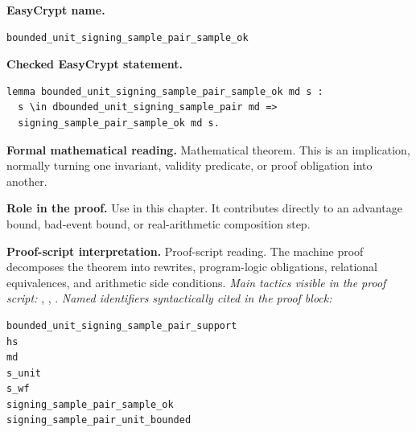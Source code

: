 \begin{formaltheorem}
\noindent\textbf{EasyCrypt name.}
\begin{lstlisting}[language=EasyCrypt,basicstyle=\ttfamily\scriptsize]
bounded_unit_signing_sample_pair_sample_ok
\end{lstlisting}
\noindent\textbf{Checked EasyCrypt statement.}
\begin{lstlisting}[language=EasyCrypt,basicstyle=\ttfamily\scriptsize]
lemma bounded_unit_signing_sample_pair_sample_ok md s :
  s \in dbounded_unit_signing_sample_pair md =>
  signing_sample_pair_sample_ok md s.
\end{lstlisting}
\noindent\textbf{Formal mathematical reading.}
Mathematical theorem. This is an implication, normally turning one invariant, validity predicate, or proof obligation into another.

\noindent\textbf{Role in the proof.}
Use in this chapter. It contributes directly to an advantage bound, bad-event bound, or real-arithmetic composition step.

\noindent\textbf{Proof-script interpretation.}
Proof-script reading. The machine proof decomposes the theorem into rewrites, program-logic obligations, relational equivalences, and arithmetic side conditions.
\emph{Main tactics visible in the proof script:} , , .
\emph{Named identifiers syntactically cited in the proof block:}
\begin{lstlisting}[language=EasyCrypt,basicstyle=\ttfamily\scriptsize]
bounded_unit_signing_sample_pair_support
hs
md
s_unit
s_wf
signing_sample_pair_sample_ok
signing_sample_pair_unit_bounded
\end{lstlisting}

\end{formaltheorem}

